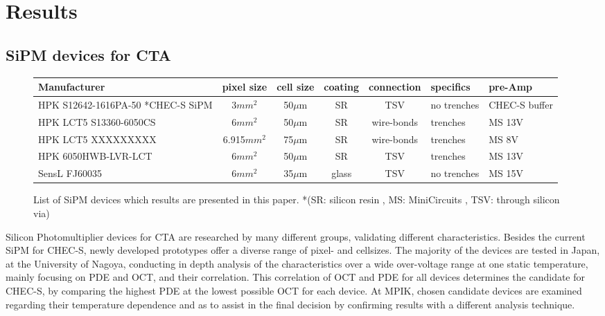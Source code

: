 \documentclass[12pt,article,type=msc,colorback,accentcolor=tud9c]{tudthesis}
\begin{document}
\clearpage
\newpage
\section{\Large Results}
\label{sec:results_ch}
\subsection{SiPM devices for CTA}

\begin{centering}
\begin{figure}[h]
\begin{tabular}{ |p{4.5cm} | c | c | c | c | p{1.5cm} | p{1.5cm} |}
    \hline
    Manufacturer                            & pixel size  & cell size & coating & connection & specifics               & pre-Amp       \\ \hline
    HPK S12642-1616PA-50  *CHEC-S SiPM               & 3$mm^2$     & 50$\mu$m  & SR      & TSV        &  no trenches & CHEC-S buffer \\ \hline
    HPK LCT5 S13360-6050CS                  & 6$mm^2$     & 50$\mu$m  & SR      & wire-bonds & trenches                & MS 13V        \\ \hline
    HPK LCT5 XXXXXXXXX                      & 6.915$mm^2$ & 75$\mu$m  & SR      & wire-bonds & trenches                & MS 8V         \\ \hline
    HPK 6050HWB-LVR-LCT                     & 6$mm^2$     & 50$\mu$m  & SR      & TSV        & trenches                & MS 13V        \\ \hline
    SensL FJ60035                           & 6$mm^2$     & 35$\mu$m  & glass   & TSV        & no trenches             & MS 15V        \\
    \hline
\end{tabular}
\caption{List of SiPM devices which results are presented in this paper. *(SR: silicon resin , MS: MiniCircuits , TSV: through silicon via)}
\end{figure}
\end{centering}
Silicon Photomultiplier devices for CTA are researched by many different groups, validating different characteristics. Besides the current SiPM for CHEC-S, newly developed prototypes offer a diverse range of pixel- and cellsizes. The majority of the devices are tested in Japan, at the University of Nagoya, conducting in depth analysis of the characteristics over a wide over-voltage range at one static temperature, mainly focusing on PDE and OCT, and their correlation. This correlation of OCT and PDE for all devices determines the candidate for CHEC-S, by comparing the highest PDE at the lowest possible OCT for each device. At MPIK, chosen candidate devices are examined regarding their temperature dependence and as to assist in the final decision by confirming results with a different analysis technique.\\
\end{document}
